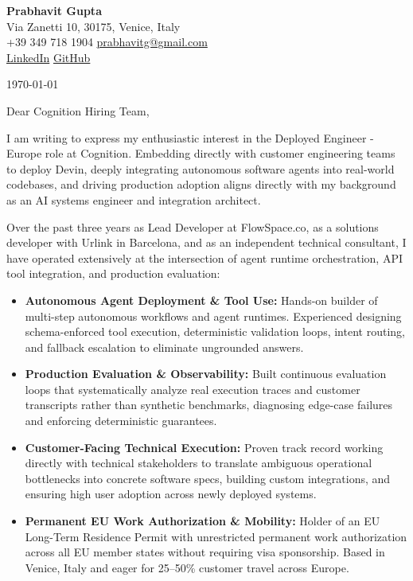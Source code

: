 \documentclass[11pt,a4paper]{article}
\begin{document}
\begin{center}
    {\huge \textbf{Prabhavit Gupta}} \\
    \vspace{4pt}
    Via Zanetti 10, 30175, Venice, Italy \\
    +39 349 718 1904 \textbar{} \href{mailto:prabhavitg@gmail.com}{prabhavitg@gmail.com} \\
    \href{https://www.linkedin.com/in/prabhavit/}{LinkedIn} \textbar{} \href{https://github.com/prab-gupta}{GitHub}
\end{center}

\vspace{10pt}

\noindent \today

\vspace{6pt}

\noindent Dear Cognition Hiring Team,

\vspace{6pt}

\noindent I am writing to express my enthusiastic interest in the Deployed Engineer - Europe role at Cognition. Embedding directly with customer engineering teams to deploy Devin, deeply integrating autonomous software agents into real-world codebases, and driving production adoption aligns directly with my background as an AI systems engineer and integration architect.

\noindent Over the past three years as Lead Developer at FlowSpace.co, as a solutions developer with Urlink in Barcelona, and as an independent technical consultant, I have operated extensively at the intersection of agent runtime orchestration, API tool integration, and production evaluation:

\begin{itemize}[leftmargin=*]
    \item \textbf{Autonomous Agent Deployment \& Tool Use:} Hands-on builder of multi-step autonomous workflows and agent runtimes. Experienced designing schema-enforced tool execution, deterministic validation loops, intent routing, and fallback escalation to eliminate ungrounded answers.
    \item \textbf{Production Evaluation \& Observability:} Built continuous evaluation loops that systematically analyze real execution traces and customer transcripts rather than synthetic benchmarks, diagnosing edge-case failures and enforcing deterministic guarantees.
    \item \textbf{Customer-Facing Technical Execution:} Proven track record working directly with technical stakeholders to translate ambiguous operational bottlenecks into concrete software specs, building custom integrations, and ensuring high user adoption across newly deployed systems.
    \item \textbf{Permanent EU Work Authorization \& Mobility:} Holder of an EU Long-Term Residence Permit with unrestricted permanent work authorization across all EU member states without requiring visa sponsorship. Based in Venice, Italy and eager for 25--50\% customer travel across Europe.
\end{itemize}
\end{document}
